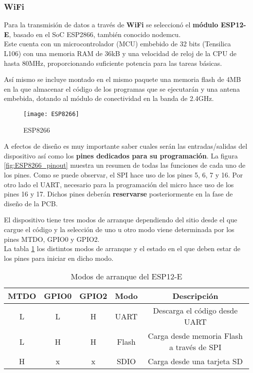 \subsubsection{WiFi\label{sec:WiFi_N}}

Para la transmisión de datos a través de \textbf{WiFi} se seleccionó el \textbf{módulo ESP12-E}, basado en el \acrshort{SoC} ESP2866, también conocido nodemcu.
\\Este cuenta con un microcontrolador (\acrshort{MCU}) embebido de 32 bits (Tensilica L106) con una memoria \acrshort{RAM} de 36kB y una velocidad de reloj de la \acrshort{CPU} de hasta 80MHz, proporcionando suficiente potencia para las tareas básicas.

Así mismo se incluye montado en el mismo paquete una memoria flash de 4MB en la que almacenar el código de los programas que se ejecutarán y una antena embebida, dotando al módulo de conectividad en la banda de 2.4GHz.

\begin{figure} [h]
    \centering
    \texttt{[image: ESP8266]}
    \caption{ESP8266}
    \label{fig:ESP8266}
\end{figure}

A efectos de diseño es muy importante saber cuales serán las entradas/salidas del dispositivo así como los \textbf{pines dedicados para su programación}. La figura \ref{fig:ESP8266_pinout} muestra un resumen de todas las funciones de cada uno de los pines. Como se puede observar, el \acrshort{SPI} hace uso de los pines 5, 6, 7 y 16. Por otro lado el \acrshort{UART}, necesario para la programación del micro hace uso de los pines 16 y 17. Dichos pines deberán \textbf{reservarse} posteriormente en la fase de diseño de la \acrshort{PCB}.

El dispositivo tiene tres modos de arranque dependiendo del sitio desde el que cargue el código y la selección de uno u otro modo viene determinada por los pines MTDO, GPIO0 y GPIO2. \\La tabla \ref{tab:ESP_Boot_Modes} los distintos modos de arranque y el estado en el que deben estar de los pines para iniciar en dicho modo.
\begin{table} [h]
 	\centering
	\begin{tabular}{|c|c|c|c|c|}
		\hline 
		MTDO & GPIO0 & GPIO2 & Modo & Descripción \\ 
		\hline 
		L & L & H & UART & Descarga el código desde UART \\ 
		\hline 
		L & H & H & Flash & Carga desde memoria Flash a través de SPI \\ 
		\hline 
		H & x & x & SDIO & Carga desde una tarjeta SD \\ 
		\hline 
	\end{tabular} 
	\caption{Modos de arranque del ESP12-E \cite{ESP_Boot_mode}}
    \label{tab:ESP_Boot_Modes}
\end{table}	

